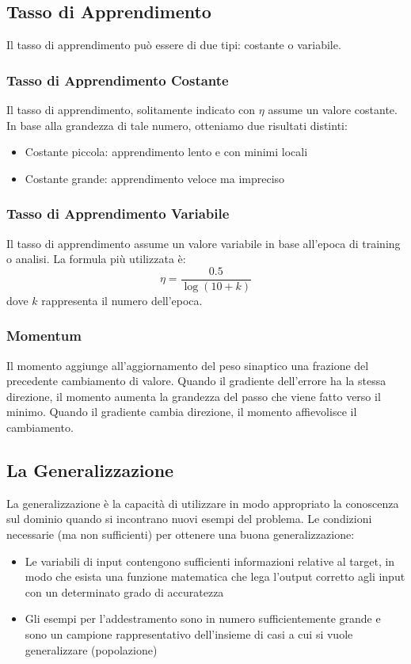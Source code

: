 \documentclass[12pt, a4paper]{article}
\begin{document}
\subsection{Tasso di Apprendimento}
Il tasso di apprendimento può essere di due tipi: costante o variabile.

\subsubsection{Tasso di Apprendimento Costante}
Il tasso di apprendimento, solitamente indicato con \(\eta\) assume un valore costante. In base alla grandezza di tale numero, otteniamo due risultati distinti:
\begin{itemize}
    \item Costante piccola: apprendimento lento e con minimi locali
    \item Costante grande: apprendimento veloce ma impreciso
\end{itemize}

\subsubsection{Tasso di Apprendimento Variabile}
Il tasso di apprendimento assume un valore variabile in base all'epoca di training o analisi. La formula più utilizzata è: \[\eta = \frac{0.5}{\log{(10+k)}}\] dove \(k\) rappresenta il numero dell'epoca.

\subsubsection{Momentum}
Il momento aggiunge all'aggiornamento del peso sinaptico una frazione del precedente cambiamento di valore. Quando il gradiente dell'errore ha la stessa direzione, il momento aumenta la grandezza del passo che viene fatto verso il minimo. Quando il gradiente cambia direzione, il momento affievolisce il cambiamento.

\subsection{La Generalizzazione}
La generalizzazione è la capacità  di utilizzare in modo appropriato la conoscenza sul dominio quando si incontrano nuovi esempi del problema. Le condizioni necessarie (ma non sufficienti) per ottenere una buona generalizzazione:
\begin{itemize}
    \item Le variabili di input contengono sufficienti informazioni relative al target, in modo che esista una funzione matematica che lega l'output corretto agli input con un determinato grado di accuratezza
    \item Gli esempi per l'addestramento sono in numero sufficientemente grande e sono un campione rappresentativo dell'insieme di casi a cui si vuole generalizzare (popolazione)
\end{itemize}
\end{document}
